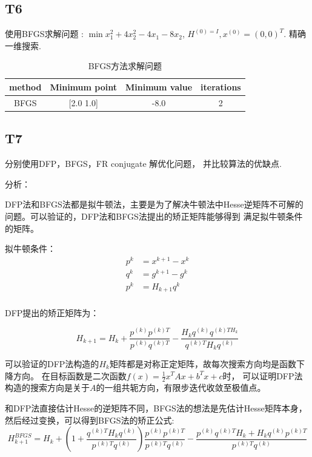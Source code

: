 \documentclass[a4paper]{article}
\begin{document}
    \subsection*{T6}
        使用BFGS求解问题 : $\min x_1^2 + 4x_2^2-4x_1 -8x_2$, $H^{(0) = I}, x^{(0)} = (0,0)^T$. 精确一维搜索. 

        \begin{table}[h!]
        \centering
        \begin{tabular}{cccc}
            \toprule
            method  &  Minimum point & Minimum value & iterations  \\
            \midrule
            BFGS & [2.0 1.0] & -8.0 & 2\\
            \bottomrule
        \end{tabular}
        \caption{BFGS方法求解问题}
        \end{table}

    \subsection*{T7}
        分别使用DFP，BFGS，FR conjugate 解优化问题， 并比较算法的优缺点. 
        
        分析：

        DFP法和BFGS法都是拟牛顿法，主要是为了解决牛顿法中Hesse逆矩阵不可解的问题。可以验证的，DFP法和BFGS法提出的矫正矩阵能够得到
        满足拟牛顿条件的矩阵。
        
        拟牛顿条件：
        \begin{align*}
            p^k &= x^{k+1}- x^{k} \\
            q^k &= g^{k+1}- g^{k} \\
            p^k &= H_{k+1}q^k \\ 
        \end{align*}

        DFP提出的矫正矩阵为：

        \begin{equation*}
            H_{k+1} = H_{k} + \frac{p^(k)p^{(k)T}}{p^(k)q^{(k)T}} - \frac{H_kq^{(k)}q^{(k)T H_k}}{q^{(k)T} H_k q^{(k)}}
        \end{equation*}

        可以验证的DFP法构造的$H_k$矩阵都是对称正定矩阵，故每次搜索方向均是函数下降方向。
        在目标函数是二次函数$f(x) = \frac{1}{2}x^TAx+b^Tx+c$时，
        可以证明DFP法构造的搜索方向是关于$A$的一组共轭方向，有限步迭代收敛至极值点。

        和DFP法直接估计Hesse的逆矩阵不同，BFGS法的想法是先估计Hesse矩阵本身，然后经过变换，可以得到BFGS法的矫正公式:
        \begin{equation*}
            H_{k+1}^{BFGS} = H_{k} + (1+ \frac{q^{(k)T}H_kq^{(k)}}{p^{(k)T}q^{(k)}})\frac{p^{(k)}p^{(k)T}}{p^{(k)T}q^{(k)}}
            - \frac{p^{(k)}q^{(k)T}H_k + H_kq^{(k)}p^{(k)T}}{p^{(k)T}q^{(k)}}
        \end{equation*} 
\end{document}
